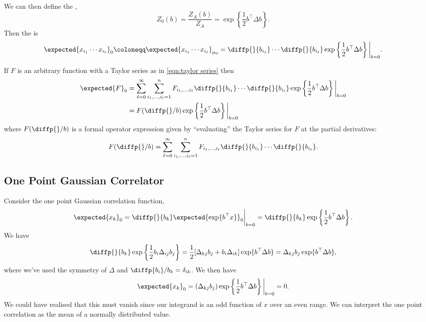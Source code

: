 \documentclass[fleqn]{NotesClass}
\newcommand{\trans}{{\top}}
\begin{document}
    We can then define the ,
    \begin{equation}
        Z_0(b) = \frac{Z_A(b)}{Z_A} = \exp\left\{ \frac{1}{2} b^\trans \Delta b \right\}.
    \end{equation}
    Then the  is
    \begin{equation}
        \expected{x_{i_1} \dotsm x_{i_\ell}}_0 \coloneqq \expected{x_{i_1} \dotsm x_{i_\ell}}_{\mu_0} = \diffp{}{b_{i_1}} \dotsm \diffp{}{b_{i_\ell}} \exp\left\{ \frac{1}{2}b^\trans \Delta b \right\}\bigg|_{b = 0}.
    \end{equation}
    
    If \(F\) is an arbitrary function with a Taylor series as in \cref{eqn:taylor series} then
    \begin{align}
        \expected{F}_0 &= \sum_{\ell = 0}^{\infty} \sum_{i_1, \dotsc, i_\ell = 1}^{n} F_{i_1, \dotsc, i_{\ell}} \diffp{}{b_{i_1}} \dotsm \diffp{}{b_{i_{\ell}}} \exp\left\{ \frac{1}{2} b^\trans \Delta b \right\} \bigg|_{b = 0}\\
        &= F(\diffp{}/{b}) \exp\left\{ \frac{1}{2} b^\trans \Delta b \right\}\bigg|_{b = 0}
    \end{align}
    where \(F(\diffp{}/{b})\) is a formal operator expression given by \enquote{evaluating} the Taylor series for \(F\) at the partial derivatives:
    \begin{equation}
        F(\diffp{}/{b}) = \sum_{\ell = 0}^{\infty} \sum_{i_1, \dotsc, i_{\ell} = 1}^{n} F_{i_1, \dotsc, i_{\ell}} \diffp{}{b_{i_1}} \dotsm \diffp{}{b_{i_\ell}}.
    \end{equation}
    
    \subsection{One Point Gaussian Correlator}
    Consider the one point Gaussian correlation function,
    \begin{equation}
        \expected{x_k}_0 = \diffp{}{b_k} \expected{\exp\{b^\trans x\}}_0 \bigg|_{b = 0} = \diffp{}{b_k} \exp\left\{ \frac{1}{2}b^\trans \Delta b \right\}.
    \end{equation}
    We have
    \begin{equation}
        \diffp{}{b_k} \exp\left\{ \frac{1}{2}b_i\Delta_{ij}b_j \right\} = \frac{1}{2}[\Delta_{kj}b_j + b_i\Delta_{ik}]\exp\{b^\trans \Delta b\} = \Delta_{kj}b_j \exp\{b^\trans \Delta b\},
    \end{equation}
    where we've used the symmetry of \(\Delta\) and \(\diffp{b_i}/{b_k} = \delta_{ik}\).
    We then have
    \begin{equation}
        \expected{x_k}_0 = (\Delta_{kj}b_j) \exp\left\{ \frac{1}{2}b^\trans \Delta b \right\}\bigg|_{b = 0} = 0.
    \end{equation}
    We could have realised that this must vanish since our integrand is an odd function of \(x\) over an even range.
    We can interpret the one point correlation as the mean of a normally distributed value.
    
\end{document}
